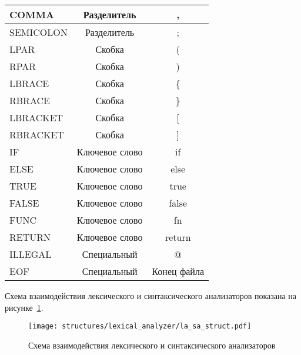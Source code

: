 \begin{table}[h!]
\begin{threeparttable}
\begin{tabularx}{\textwidth}{|X|c|c|}
            \hline
            COMMA         & Разделитель    & ,               \\
            \hline
            SEMICOLON     & Разделитель    & ;               \\
            \hline
            LPAR          & Скобка         & (               \\
            \hline
            RPAR          & Скобка         & )               \\
            \hline
            LBRACE        & Скобка         & \{              \\
            \hline
            RBRACE        & Скобка         & \}              \\
            \hline
            LBRACKET      & Скобка         & [               \\
            \hline
            RBRACKET      & Скобка         & ]               \\
            \hline
            IF            & Ключевое слово & if              \\
            \hline
            ELSE          & Ключевое слово & else            \\
            \hline
            TRUE          & Ключевое слово & true            \\
            \hline
            FALSE         & Ключевое слово & false           \\
            \hline
            FUNC          & Ключевое слово & fn              \\
            \hline
            RETURN        & Ключевое слово & return          \\
            \hline
            ILLEGAL       & Специальный    & @               \\
            \hline
            EOF           & Специальный    & Конец файла     \\
            \hline
        \end{tabularx}
    \end{threeparttable}
    \vspace{\bottompaddingoftable}
\end{table}

Схема взаимодействия лексического и синтаксического анализаторов показана на рисунке~\ref{f:la_sa_struct}.

\begin{figure}[ht]
	\centering
	\vspace{\toppaddingoffigure}
	\texttt{[image: structures/lexical\_analyzer/la\_sa\_struct.pdf]}
	\caption{Схема взаимодействия лексического и синтаксического анализаторов}
	\label{f:la_sa_struct}
\end{figure}

